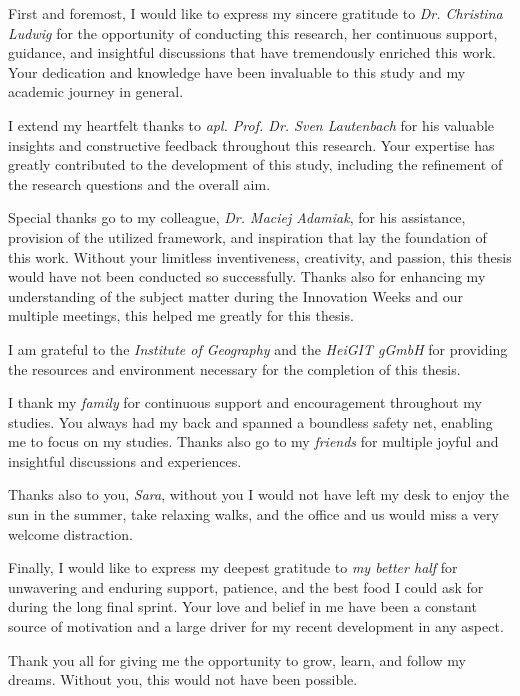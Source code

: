 First and foremost, I would like to express my sincere gratitude to \emph{Dr. Christina Ludwig} for the opportunity of conducting this research, her continuous support, guidance, and insightful discussions that have tremendously enriched this work. Your dedication and knowledge have been invaluable to this study and my academic journey in general.

I extend my heartfelt thanks to \emph{apl. Prof. Dr. Sven Lautenbach} for his valuable insights and constructive feedback throughout this research. Your expertise has greatly contributed to the development of this study, including the refinement of the research questions and the overall aim.

Special thanks go to my colleague, \emph{Dr. Maciej Adamiak}, for his assistance, provision of the utilized framework, and inspiration that lay the foundation of this work. Without your limitless inventiveness, creativity, and passion, this thesis would have not been conducted so successfully. Thanks also for enhancing my understanding of the subject matter during the Innovation Weeks and our multiple meetings, this helped me greatly for this thesis.

I am grateful to the \emph{Institute of Geography} and the \emph{HeiGIT gGmbH} for providing the resources and environment necessary for the completion of this thesis. 

I thank my \emph{family} for continuous support and encouragement throughout my studies. You always had my back and spanned a boundless safety net, enabling me to focus on my studies. Thanks also go to my \emph{friends} for multiple joyful and insightful discussions and experiences.

Thanks also to you, \emph{Sara}, without you I would not have left my desk to enjoy the sun in the summer, take relaxing walks, and the office and us would miss a very welcome distraction.

Finally, I would like to express my deepest gratitude to \emph{my better half} for unwavering and enduring support, patience, and the best food I could ask for during the long final sprint. Your love and belief in me have been a constant source of motivation and a large driver for my recent development in any aspect.

Thank you all for giving me the opportunity to grow, learn, and follow my dreams.  Without you, this would not have been possible.